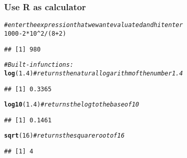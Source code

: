 \documentclass[pdf]{beamer}\usepackage[]{graphicx}\usepackage[]{color}
\makeatletter
\newcommand{\hlnum}[1]{\textcolor[rgb]{0.686,0.059,0.569}{#1}}%
\newcommand{\hlcom}[1]{\textcolor[rgb]{0.678,0.584,0.686}{\textit{#1}}}%
\newcommand{\hlopt}[1]{\textcolor[rgb]{0,0,0}{#1}}%
\newcommand{\hlstd}[1]{\textcolor[rgb]{0.345,0.345,0.345}{#1}}%
\newcommand{\hlkwd}[1]{\textcolor[rgb]{0.737,0.353,0.396}{\textbf{#1}}}%
\newenvironment{kframe}{%
 \def\at@end@of@kframe{}%
 \ifinner\ifhmode%
  \def\at@end@of@kframe{\end{minipage}}%
  \begin{minipage}{\columnwidth}%
 \fi\fi%
 \def\FrameCommand##1{\hskip\@totalleftmargin \hskip-\fboxsep
 \colorbox{shadecolor}{##1}\hskip-\fboxsep
     \hskip-\linewidth \hskip-\@totalleftmargin \hskip\columnwidth}%
 \MakeFramed {\advance\hsize-\width
   \@totalleftmargin\z@ \linewidth\hsize
   \@setminipage}}%
 {\par\unskip\endMakeFramed%
 \at@end@of@kframe}
\newenvironment{knitrout}{}{} %
\makeatother
\begin{document}
\begin{frame}[fragile]\frametitle{Use R as calculator}
\begin{knitrout}
\color{fgcolor}\begin{kframe}
\begin{alltt}
\hlcom{# enter the expression that we want evaluated and hit enter}
\hlnum{1000} \hlopt{-} \hlnum{2} \hlopt{*} \hlnum{10}\hlopt{^}\hlnum{2}\hlopt{/}\hlstd{(}\hlnum{8} \hlopt{+} \hlnum{2}\hlstd{)}
\end{alltt}
\begin{verbatim}
## [1] 980
\end{verbatim}
\end{kframe}
\end{knitrout}
\begin{knitrout}
\color{fgcolor}\begin{kframe}
\begin{alltt}
\hlcom{# Built-in functions:}
\hlkwd{log}\hlstd{(}\hlnum{1.4}\hlstd{)}  \hlcom{#returns the natural logarithm of the number 1.4}
\end{alltt}
\begin{verbatim}
## [1] 0.3365
\end{verbatim}
\begin{alltt}
\hlkwd{log10}\hlstd{(}\hlnum{1.4}\hlstd{)}  \hlcom{# returns the log to the base of 10}
\end{alltt}
\begin{verbatim}
## [1] 0.1461
\end{verbatim}
\begin{alltt}
\hlkwd{sqrt}\hlstd{(}\hlnum{16}\hlstd{)}  \hlcom{#returns the square root of 16}
\end{alltt}
\begin{verbatim}
## [1] 4
\end{verbatim}
\end{kframe}
\end{knitrout}
\end{frame}
\end{document}
